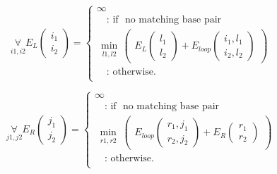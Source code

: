 \begin{equation*}
\underset{i1, i2}{\forall}
E_L(\substack{i_1\\i_2}) = \begin{cases}
\infty\\
\quad\text{: if } \text{ no matching base pair }\\
\min\limits_{\substack{l1, l2}}
\begin{pmatrix}
E_L(\substack{l_1\\l_2}) + E_{loop}(\substack{i_1,l_1\\i_2,l_2})
\end{pmatrix}\\
\quad\text{: otherwise.}\\

\end{cases}
\end{equation*}

\begin{equation*}
\underset{j1, j2}{\forall}
E_R(\substack{j_1\\j_2}) = \begin{cases}
\infty\\
\quad\text{: if } \text{ no matching base pair }\\
\min\limits_{\substack{r1, r2}}
\begin{pmatrix}
E_{loop}(\substack{r_1,j_1\\r_2,j_2}) + E_R(\substack{r_1\\r_2})
\end{pmatrix}\\
\quad\text{: otherwise.}\\

\end{cases}
\end{equation*}


